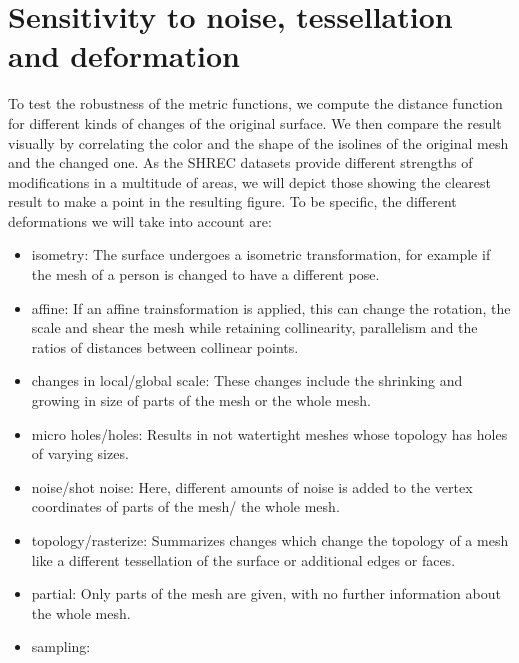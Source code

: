 \section{Sensitivity to noise, tessellation and deformation}
To test the robustness of the metric functions, we compute the distance function for different kinds of changes of the original surface.
We then compare the result visually by correlating the color and the shape of the isolines of the original mesh and the changed one.
As the SHREC datasets provide different strengths of modifications in a multitude of areas, we will depict those showing the clearest result to make a point in the resulting figure.
To be specific, the different deformations we will take into account are:
\begin{itemize}
	\item isometry: The surface undergoes a isometric transformation, for example if the mesh of a person is changed to have a different pose.
	\item affine: If an affine trainsformation is applied, this can change the rotation, the scale and shear the mesh while retaining collinearity, parallelism and the ratios of distances between collinear points.
	\item changes in local/global scale: These changes include the shrinking and growing in size of parts of the mesh or the whole mesh.
	\item micro holes/holes: Results in not watertight meshes whose topology has holes of varying sizes.
	\item noise/shot noise: Here, different amounts of noise is added to the vertex coordinates of parts of the mesh/ the whole mesh.
	\item topology/rasterize: Summarizes changes which change the topology of a mesh like a different tessellation of the surface or  additional edges or faces.
	\item partial: Only parts of the mesh are given, with no further information about the whole mesh.
	\item sampling: %
\end{itemize}

